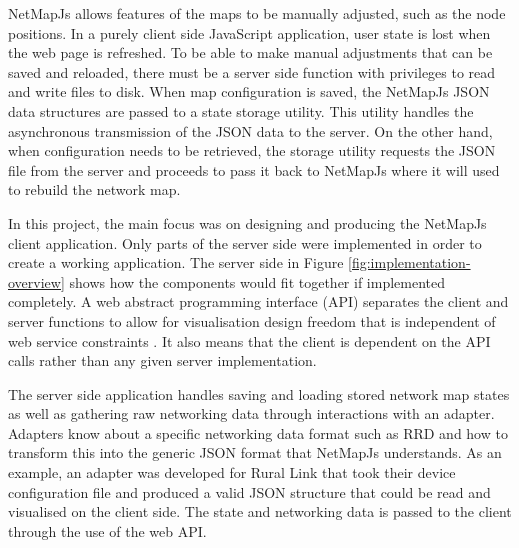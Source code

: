 \documentclass[11pt, a4paper]{report}
\begin{document}
NetMapJs allows features of the maps to be manually adjusted, such as the node
positions. In a purely client side JavaScript application, user state is lost
when the web page is refreshed. To be able to make manual adjustments that can
be saved and reloaded, there must be a server side function with privileges to
read and write files to disk. When map configuration is saved, the NetMapJs JSON
data structures are passed to a state storage utility. This utility handles the
asynchronous transmission of the JSON data to the server. On the other hand,
when configuration needs to be retrieved, the storage utility requests the JSON
file from the server and proceeds to pass it back to NetMapJs where it will used
to rebuild the network map.

In this project, the main focus was on designing and producing the NetMapJs
client application. Only parts of the server side were implemented in order to
create a working application. The server side in Figure
\ref{fig:implementation-overview} shows how the components would fit together if
implemented completely. A web abstract programming interface (API) separates the
client and server functions to allow for visualisation design freedom that is
independent of web service constraints \cite{Wood_2008}. It also means that the
client is dependent on the API calls rather than any given server implementation.

The server side application handles saving and loading stored network map states
as well as gathering raw networking data through interactions with an adapter.
Adapters know about a specific networking data format such as RRD and how to
transform this into the generic JSON format that NetMapJs understands. As an
example, an adapter was developed for Rural Link that took their device
configuration file and produced a valid JSON structure that could be read and
visualised on the client side. The state and networking data is passed to the
client through the use of the web API.
\end{document}

